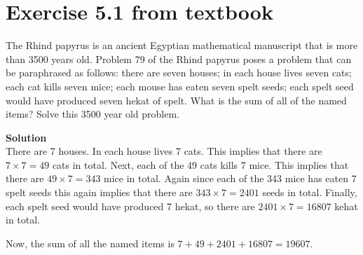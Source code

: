 \documentclass[12pt]{ut-thesis}
\theoremstyle{definition}
\begin{document}
	\section*{Exercise 5.1 from textbook}
	The Rhind papyrus is an ancient Egyptian mathematical manuscript that is more than 3500 years old.
	Problem 79 of the Rhind papyrus poses a problem that can be paraphrased as follows: there are seven houses;
	in each house lives seven cats; each cat kills seven mice; each mouse has eaten seven spelt seeds; each spelt seed
	would have produced seven hekat of spelt. What is the sum of all of the named
	items? Solve this 3500 year old problem.

	\textbf{Solution}\\
	There are 7 houses. In each house lives 7 cats. This implies that there are $7\times 7 =49$ cats in total.
	Next, each of the 49 cats kills 7 mice. This implies that there are $49 \times 7 = 343$ mice
	in total. Again since each of the 343 mice has eaten 7 spelt seeds this again implies that there are $343 \times 7 = 2401$
	seeds in total. Finally, each spelt seed would have produced 7 hekat, so there are $2401 \times 7 = 16807$ kehat
	in total.

	Now, the sum of all the named items is $7 + 49 + 2401 + 16807 = 19607$.
\end{document}
